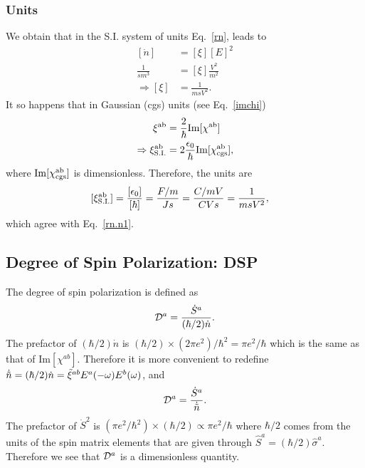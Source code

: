 \documentclass[floatfix,prb,aps,superscriptaddress,11pt]{revtex4}
\begin{document}
\subsubsection{Units}

We obtain that in the S.I. system of units 
Eq.~\eqref{rn}, leads to 
\begin{align}\label{rn.n1}
[\dot n]&=[\xi] [E]^2 
\nonumber\\
\frac{1}{sm^3}&=[\xi] \frac{V^2}{m^2}
\nonumber\\
\Rightarrow 
[\xi]&=\frac{1}{msV^2}
. 
\end{align}
It so happens that in Gaussian (cgs) units   (see Eq.~\eqref{imchi}) 
\begin{align}\label{rn.n2}
\xi^{\mathrm{a}\mathrm{b}}&=\frac{2}{\hbar}
\mathrm{Im}[\chi^{\mathrm{a}\mathrm{b}}]
\nonumber\\
\Rightarrow  
\xi^{\mathrm{a}\mathrm{b}}_{\mathrm{S.I.}}&=2\frac{\epsilon_0}{\hbar}
\mathrm{Im}[\chi^{\mathrm{a}\mathrm{b}}_{\mathrm{cgs}}]
,
\end{align}  
where $\mathrm{Im}[\chi^{\mathrm{a}\mathrm{b}}_{\mathrm{cgs}}]$ is  
dimensionless. Therefore, the units are 
\begin{align}\label{rn.n3}
[\xi^{\mathrm{a}\mathrm{b}}_{\mathrm{S.I.}}]&=\frac{[\epsilon_0]}{[\hbar]}
=\frac{F/m}{Js}=\frac{C/mV}{CVs}
=\frac{1}{msV^2}
,
\end{align} 
which agree with Eq.~\eqref{rn.n1}.
\subsection{Degree of Spin Polarization: DSP}\label{dsp}

The degree of spin polarization is defined as
\begin{equation}\label{dsp1}
{\cal D}^a=\frac{\dot S^a}{(\hbar/2)\dot n}
.  
\end{equation}   
The prefactor of $(\hbar/2)\dot n$ is 
$(\hbar/2)\times (2\pi e^2)/\hbar^2=\pi e^2/\hbar$ which is the same
as that of Im$[\chi^{ab}]$. Therefore it is more convenient to
redefine 
$\dot{\tilde n}=(\hbar/2)\dot n=\tilde\xi^{ab}E^a(-\omega)E^b(\omega)$,  
and
\begin{equation}\label{dsp2}
{\cal D}^a=\frac{\dot S^a}{\dot{\tilde n}}
.
\end{equation}
The prefactor of $\dot S^2$ is
 $(\pi e^2/\hbar^2)\times(\hbar/2)\propto \pi e^2/\hbar$
where $\hbar/2$ comes from the units of the spin matrix elements that
are given through $\hat S^a=(\hbar/2)\hat\sigma^a$. Therefore we see
that ${\cal D}^a$ is a dimensionless quantity.
\end{document}
